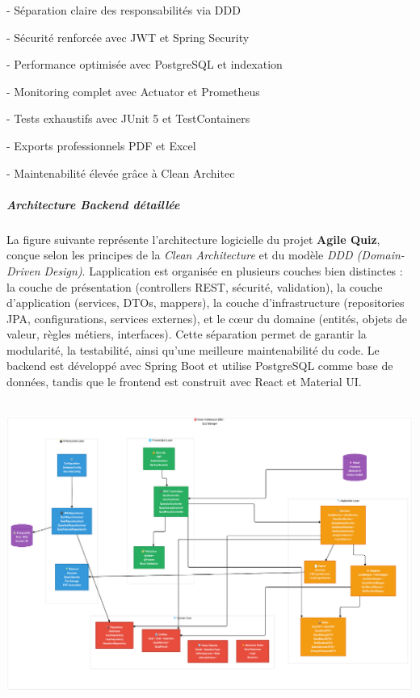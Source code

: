 \documentclass[12pt,a4paper,twoside]{report}
\begin{document}
- Séparation claire des responsabilités via DDD

- Sécurité renforcée avec JWT et Spring Security

- Performance optimisée avec PostgreSQL et indexation

- Monitoring complet avec Actuator et Prometheus

- Tests exhaustifs avec JUnit 5 et TestContainers

- Exports professionnels PDF et Excel

- Maintenabilité élevée grâce à Clean Architec

\hypertarget{architecture-backend-duxe9tailluxe9e}{%
\subparagraph{\texorpdfstring{\textbf{Architecture Backend
détaillée}}{Architecture Backend détaillée}}\label{architecture-backend-duxe9tailluxe9e}}

La figure suivante représente l'architecture logicielle du projet
\textbf{Agile Quiz}, conçue selon les principes de la \emph{Clean
Architecture} et du modèle \emph{DDD (Domain-Driven Design)}.
L\textquotesingle application est organisée en plusieurs couches bien
distinctes : la couche de présentation (controllers REST, sécurité,
validation), la couche d'application (services, DTOs, mappers), la
couche d'infrastructure (repositories JPA, configurations, services
externes), et le cœur du domaine (entités, objets de valeur, règles
métiers, interfaces). Cette séparation permet de garantir la modularité,
la testabilité, ainsi qu'une meilleure maintenabilité du code. Le
backend est développé avec Spring Boot et utilise PostgreSQL comme base
de données, tandis que le frontend est construit avec React et Material
UI.

\includegraphics[width=5.80486in,height=3.92639in]{latex_media/media/image48.png}
\end{document}
